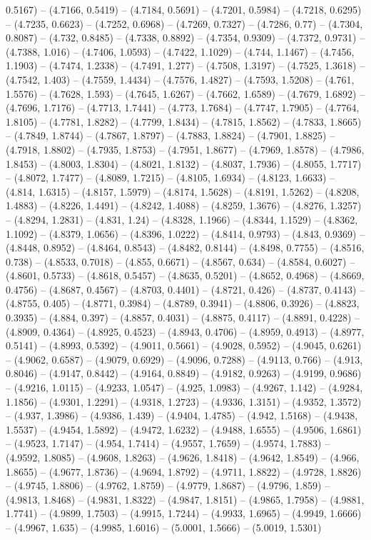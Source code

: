 0.5167) -- (4.7166, 0.5419) -- (4.7184, 0.5691) -- (4.7201, 0.5984) -- (4.7218, 0.6295) -- (4.7235, 0.6623) -- (4.7252, 0.6968) -- (4.7269, 0.7327) -- (4.7286, 0.77) -- (4.7304, 0.8087) -- (4.732, 0.8485) -- (4.7338, 0.8892) -- (4.7354, 0.9309) -- (4.7372, 0.9731) -- (4.7388, 1.016) -- (4.7406, 1.0593) -- (4.7422, 1.1029) -- (4.744, 1.1467) -- (4.7456, 1.1903) -- (4.7474, 1.2338) -- (4.7491, 1.277) -- (4.7508, 1.3197) -- (4.7525, 1.3618) -- (4.7542, 1.403) -- (4.7559, 1.4434) -- (4.7576, 1.4827) -- (4.7593, 1.5208) -- (4.761, 1.5576) -- (4.7628, 1.593) -- (4.7645, 1.6267) -- (4.7662, 1.6589) -- (4.7679, 1.6892) -- (4.7696, 1.7176) -- (4.7713, 1.7441) -- (4.773, 1.7684) -- (4.7747, 1.7905) -- (4.7764, 1.8105) -- (4.7781, 1.8282) -- (4.7799, 1.8434) -- (4.7815, 1.8562) -- (4.7833, 1.8665) -- (4.7849, 1.8744) -- (4.7867, 1.8797) -- (4.7883, 1.8824) -- (4.7901, 1.8825) -- (4.7918, 1.8802) -- (4.7935, 1.8753) -- (4.7951, 1.8677) -- (4.7969, 1.8578) -- (4.7986, 1.8453) -- (4.8003, 1.8304) -- (4.8021, 1.8132) -- (4.8037, 1.7936) -- (4.8055, 1.7717) -- (4.8072, 1.7477) -- (4.8089, 1.7215) -- (4.8105, 1.6934) -- (4.8123, 1.6633) -- (4.814, 1.6315) -- (4.8157, 1.5979) -- (4.8174, 1.5628) -- (4.8191, 1.5262) -- (4.8208, 1.4883) -- (4.8226, 1.4491) -- (4.8242, 1.4088) -- (4.8259, 1.3676) -- (4.8276, 1.3257) -- (4.8294, 1.2831) -- (4.831, 1.24) -- (4.8328, 1.1966) -- (4.8344, 1.1529) -- (4.8362, 1.1092) -- (4.8379, 1.0656) -- (4.8396, 1.0222) -- (4.8414, 0.9793) -- (4.843, 0.9369) -- (4.8448, 0.8952) -- (4.8464, 0.8543) -- (4.8482, 0.8144) -- (4.8498, 0.7755) -- (4.8516, 0.738) -- (4.8533, 0.7018) -- (4.855, 0.6671) -- (4.8567, 0.634) -- (4.8584, 0.6027) -- (4.8601, 0.5733) -- (4.8618, 0.5457) -- (4.8635, 0.5201) -- (4.8652, 0.4968) -- (4.8669, 0.4756) -- (4.8687, 0.4567) -- (4.8703, 0.4401) -- (4.8721, 0.426) -- (4.8737, 0.4143) -- (4.8755, 0.405) -- (4.8771, 0.3984) -- (4.8789, 0.3941) -- (4.8806, 0.3926) -- (4.8823, 0.3935) -- (4.884, 0.397) -- (4.8857, 0.4031) -- (4.8875, 0.4117) -- (4.8891, 0.4228) -- (4.8909, 0.4364) -- (4.8925, 0.4523) -- (4.8943, 0.4706) -- (4.8959, 0.4913) -- (4.8977, 0.5141) -- (4.8993, 0.5392) -- (4.9011, 0.5661) -- (4.9028, 0.5952) -- (4.9045, 0.6261) -- (4.9062, 0.6587) -- (4.9079, 0.6929) -- (4.9096, 0.7288) -- (4.9113, 0.766) -- (4.913, 0.8046) -- (4.9147, 0.8442) -- (4.9164, 0.8849) -- (4.9182, 0.9263) -- (4.9199, 0.9686) -- (4.9216, 1.0115) -- (4.9233, 1.0547) -- (4.925, 1.0983) -- (4.9267, 1.142) -- (4.9284, 1.1856) -- (4.9301, 1.2291) -- (4.9318, 1.2723) -- (4.9336, 1.3151) -- (4.9352, 1.3572) -- (4.937, 1.3986) -- (4.9386, 1.439) -- (4.9404, 1.4785) -- (4.942, 1.5168) -- (4.9438, 1.5537) -- (4.9454, 1.5892) -- (4.9472, 1.6232) -- (4.9488, 1.6555) -- (4.9506, 1.6861) -- (4.9523, 1.7147) -- (4.954, 1.7414) -- (4.9557, 1.7659) -- (4.9574, 1.7883) -- (4.9592, 1.8085) -- (4.9608, 1.8263) -- (4.9626, 1.8418) -- (4.9642, 1.8549) -- (4.966, 1.8655) -- (4.9677, 1.8736) -- (4.9694, 1.8792) -- (4.9711, 1.8822) -- (4.9728, 1.8826) -- (4.9745, 1.8806) -- (4.9762, 1.8759) -- (4.9779, 1.8687) -- (4.9796, 1.859) -- (4.9813, 1.8468) -- (4.9831, 1.8322) -- (4.9847, 1.8151) -- (4.9865, 1.7958) -- (4.9881, 1.7741) -- (4.9899, 1.7503) -- (4.9915, 1.7244) -- (4.9933, 1.6965) -- (4.9949, 1.6666) -- (4.9967, 1.635) -- (4.9985, 1.6016) -- (5.0001, 1.5666) -- (5.0019, 1.5301) 